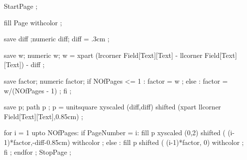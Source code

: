

StartPage ;

fill Page withcolor  ;

save diff ;numeric diff; 
diff = .3cm ;

save w; numeric w; 
w = xpart (lrcorner Field[Text][Text] - llcorner Field[Text][Text]) - diff ;

save factor; numeric factor; 
if NOfPages <= 1 :
  factor = w ;
else :
  factor = w/(NOfPages - 1) ;
fi ;

save p; path p ;
p = unitsquare xyscaled (diff,diff) 
               shifted (xpart llcorner Field[Text][Text],0.85cm) ;

for i = 1 upto NOfPages:
  if PageNumber = i:
    fill p xyscaled (0,2) shifted ( (i-1)*factor,-diff-0.85cm) 
         withcolor  ;
  else :
    fill p shifted ( (i-1)*factor, 0) 
         withcolor  ;
  fi ;
endfor ;
StopPage ;
\stopuseMPgraphic 





\setupTitle
  [\c!headcolor={simpleslides:contrastcolor}]


\setupSlideTitle
  [\c!color={simpleslides:contrastcolor},
   \c!alternative=layer,
   \c!align=\v!center,
   \c!width=\textwidth,
   \c!height=3cm,
   \c!after=]


\setupitemize[1][color={simpleslides:itemize:color}]

\protect
\stopmodule

\endinput


